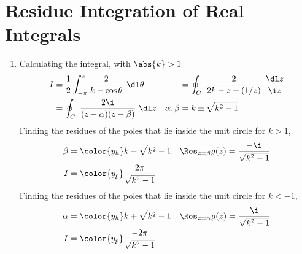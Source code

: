 \section{Residue Integration of Real Integrals}

\begin{enumerate}
    \item Calculating the integral, with $ \abs{k} > 1 $
          \begin{align}
              I             & = \frac{1}{2} \int_{-\pi}^{\pi} \frac{2}{k - \cos\theta}
              \ \dl \theta  &
                            & = \oint_C\ \frac{2}{2k - z - (1/z)}
              \ \frac{\dl z}{\i z}                                                     \\
                            & = \oint_C\ \frac{2\i}{(z - \alpha)
                  (z - \beta)}
              \ \dl z       &
              \alpha, \beta & = k \pm \sqrt{k^2 - 1}
          \end{align}
          Finding the residues of the poles that lie inside the unit circle for
          $ k > 1 $,
          \begin{align}
              \beta                 & = \color{y_h} k - \sqrt{k^2 - 1}          &
              \Res_{z = \beta} g(z) & = \frac{-\i}{\sqrt{k^2 - 1}}                \\
              I                     & = \color{y_p} \frac{2\pi}{\sqrt{k^2 - 1}}
          \end{align}
          Finding the residues of the poles that lie inside the unit circle for
          $ k < -1 $,
          \begin{align}
              \alpha                 & = \color{y_h} k + \sqrt{k^2 - 1}           &
              \Res_{z = \alpha} g(z) & = \frac{\i}{\sqrt{k^2 - 1}}                  \\
              I                      & = \color{y_p} \frac{-2\pi}{\sqrt{k^2 - 1}}
          \end{align}


\end{enumerate}
